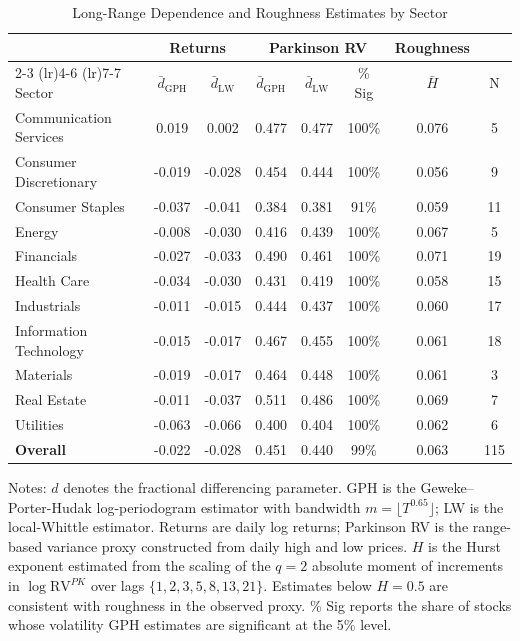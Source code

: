 
\begin{table}[t]
\centering
\caption{Long-Range Dependence and Roughness Estimates by Sector}
\label{tab:lrd_estimates}
\footnotesize
\setlength{\tabcolsep}{4pt}
\begin{threeparttable}
\begin{tabular*}{\textwidth}{@{\extracolsep{\fill}}lccccccc}
\toprule
 & \multicolumn{2}{c}{Returns} & \multicolumn{3}{c}{Parkinson RV} & \multicolumn{1}{c}{Roughness} & \\
\cmidrule(lr){2-3} \cmidrule(lr){4-6} \cmidrule(lr){7-7}
Sector & $\bar d_{\mathrm{GPH}}$ & $\bar d_{\mathrm{LW}}$ 
& $\bar d_{\mathrm{GPH}}$ & $\bar d_{\mathrm{LW}}$ & \% Sig 
& $\bar H$ & N \\
\midrule
Communication Services & 0.019 & 0.002 & 0.477 & 0.477 & 100\% & 0.076 & 5 \\
Consumer Discretionary & -0.019 & -0.028 & 0.454 & 0.444 & 100\% & 0.056 & 9 \\
Consumer Staples & -0.037 & -0.041 & 0.384 & 0.381 & 91\% & 0.059 & 11 \\
Energy & -0.008 & -0.030 & 0.416 & 0.439 & 100\% & 0.067 & 5 \\
Financials & -0.027 & -0.033 & 0.490 & 0.461 & 100\% & 0.071 & 19 \\
Health Care & -0.034 & -0.030 & 0.431 & 0.419 & 100\% & 0.058 & 15 \\
Industrials & -0.011 & -0.015 & 0.444 & 0.437 & 100\% & 0.060 & 17 \\
Information Technology & -0.015 & -0.017 & 0.467 & 0.455 & 100\% & 0.061 & 18 \\
Materials & -0.019 & -0.017 & 0.464 & 0.448 & 100\% & 0.061 & 3 \\
Real Estate & -0.011 & -0.037 & 0.511 & 0.486 & 100\% & 0.069 & 7 \\
Utilities & -0.063 & -0.066 & 0.400 & 0.404 & 100\% & 0.062 & 6 \\
\midrule
\textbf{Overall} & -0.022 & -0.028 & 0.451 & 0.440 & 99\% & 0.063 & 115 \\
\bottomrule
\end{tabular*}

\begin{tablenotes}[flushleft]
\footnotesize
\item Notes: $d$ denotes the fractional differencing parameter. GPH is the
Geweke--Porter-Hudak log-periodogram estimator with bandwidth $m=\lfloor
T^{0.65}\rfloor$; LW is the local-Whittle estimator. Returns are daily log
returns; Parkinson RV is the range-based variance proxy constructed from
daily high and low prices. $H$ is the Hurst exponent estimated from the
scaling of the $q=2$ absolute moment of increments in $\log\mathrm{RV}^{PK}$
over lags $\{1,2,3,5,8,13,21\}$. Estimates below $H=0.5$ are consistent
with roughness in the observed proxy. \% Sig reports the share of stocks
whose volatility GPH estimates are significant at the 5\% level.
\end{tablenotes}
\end{threeparttable}
\end{table}
